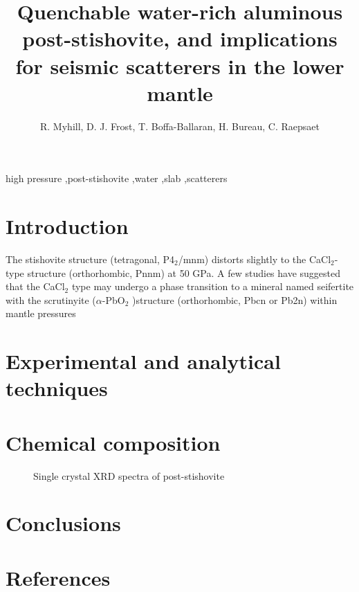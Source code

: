 \documentclass[review]{elsarticle}
\begin{document}
\begin{frontmatter}

\title{Quenchable water-rich aluminous post-stishovite, and implications for seismic scatterers in the lower mantle}

\author{R. Myhill, D. J. Frost, T. Boffa-Ballaran, H. Bureau, C. Raepsaet}
\address{Bayerisches Geoinstitut, Universit\"{a}t Bayreuth, Universit\"{a}tsstrasse 30, 95447 Bayreuth, Germany}

\begin{abstract}

\end{abstract}

\begin{keyword}
high pressure \sep post-stishovite \sep water \sep slab \sep scatterers
\end{keyword}

\end{frontmatter}

\linenumbers

\section{Introduction}

The stishovite structure (tetragonal, P4$_2$/mnm) distorts slightly to the CaCl$_2$-type structure (orthorhombic, Pnnm) at 50 GPa. A few studies have suggested that the CaCl$_2$ type may undergo a phase transition to a mineral named seifertite with the scrutinyite ($\alpha$-PbO$_2$ )structure (orthorhombic, Pbcn or Pb2n) within mantle pressures

\cite{TY1989}
\cite{AFGH1998}
\cite{KCHM1995}
\cite{OHMI2002}
\cite{Lakshtanovetal2007}
\cite{Lakshtanovetal2005}
\cite{SAP2012}
\cite{PS2004}
\cite{BBB2006}
\cite{LKSOLBI2007}
\cite{CK2002}
\cite{HP2011}
\cite{SLB2011}
\cite{CHRU2014}

\section{Experimental and analytical techniques}

\section{Chemical composition}
\begin{figure}[ht!]
  \centering
  \caption{Single crystal XRD spectra of post-stishovite}
  \label{fig:xrd_post_stv}
\end{figure}

\section{Conclusions}



\clearpage
\section*{References}


\end{document}
